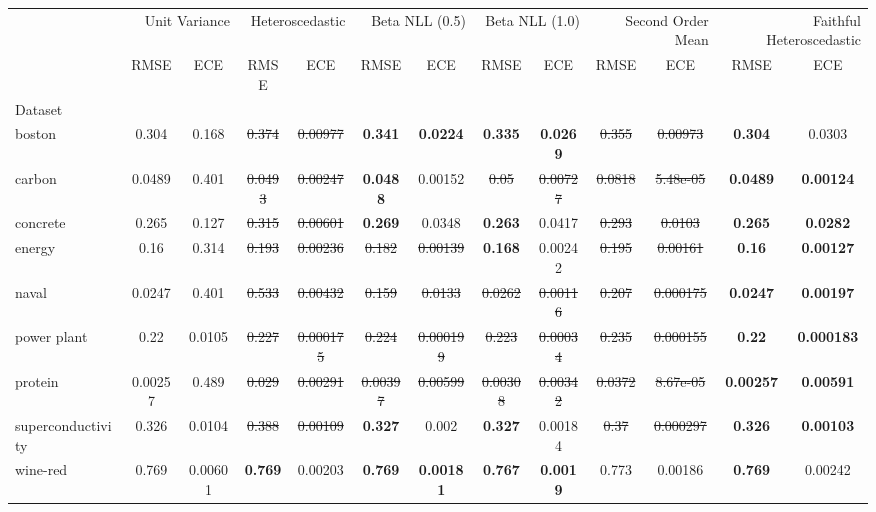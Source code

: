 \begin{tabular}{l|cc|cc|cc|cc|cc|cc}
\toprule
{} & \multicolumn{2}{r}{Unit Variance} & \multicolumn{2}{r}{Heteroscedastic} & \multicolumn{2}{r}{Beta NLL (0.5)} & \multicolumn{2}{r}{Beta NLL (1.0)} & \multicolumn{2}{r}{Second Order Mean} & \multicolumn{2}{r}{Faithful Heteroscedastic} \\
{} & {RMSE} & {ECE} & {RMSE} & {ECE} & {RMSE} & {ECE} & {RMSE} & {ECE} & {RMSE} & {ECE} & {RMSE} & {ECE} \\
{Dataset} & {} & {} & {} & {} & {} & {} & {} & {} & {} & {} & {} & {} \\
\midrule
boston & 0.304 & 0.168 & \sout{0.374} & \sout{0.00977} & \textbf{0.341} & \textbf{0.0224} & \textbf{0.335} & \textbf{0.0269} & \sout{0.355} & \sout{0.00973} & \textbf{0.304} & 0.0303 \\
carbon & 0.0489 & 0.401 & \sout{0.0493} & \sout{0.00247} & \textbf{0.0488} & 0.00152 & \sout{0.05} & \sout{0.00727} & \sout{0.0818} & \sout{5.48e-05} & \textbf{0.0489} & \textbf{0.00124} \\
concrete & 0.265 & 0.127 & \sout{0.315} & \sout{0.00601} & \textbf{0.269} & 0.0348 & \textbf{0.263} & 0.0417 & \sout{0.293} & \sout{0.0103} & \textbf{0.265} & \textbf{0.0282} \\
energy & 0.16 & 0.314 & \sout{0.193} & \sout{0.00236} & \sout{0.182} & \sout{0.00139} & \textbf{0.168} & 0.00242 & \sout{0.195} & \sout{0.00161} & \textbf{0.16} & \textbf{0.00127} \\
naval & 0.0247 & 0.401 & \sout{0.533} & \sout{0.00432} & \sout{0.159} & \sout{0.0133} & \sout{0.0262} & \sout{0.00116} & \sout{0.207} & \sout{0.000175} & \textbf{0.0247} & \textbf{0.00197} \\
power plant & 0.22 & 0.0105 & \sout{0.227} & \sout{0.000175} & \sout{0.224} & \sout{0.000199} & \sout{0.223} & \sout{0.00034} & \sout{0.235} & \sout{0.000155} & \textbf{0.22} & \textbf{0.000183} \\
protein & 0.00257 & 0.489 & \sout{0.029} & \sout{0.00291} & \sout{0.00397} & \sout{0.00599} & \sout{0.00308} & \sout{0.00342} & \sout{0.0372} & \sout{8.67e-05} & \textbf{0.00257} & \textbf{0.00591} \\
superconductivity & 0.326 & 0.0104 & \sout{0.388} & \sout{0.00109} & \textbf{0.327} & 0.002 & \textbf{0.327} & 0.00184 & \sout{0.37} & \sout{0.000297} & \textbf{0.326} & \textbf{0.00103} \\
wine-red & 0.769 & 0.00601 & \textbf{0.769} & 0.00203 & \textbf{0.769} & \textbf{0.00181} & \textbf{0.767} & \textbf{0.0019} & 0.773 & 0.00186 & \textbf{0.769} & 0.00242 \\

\end{tabular}
